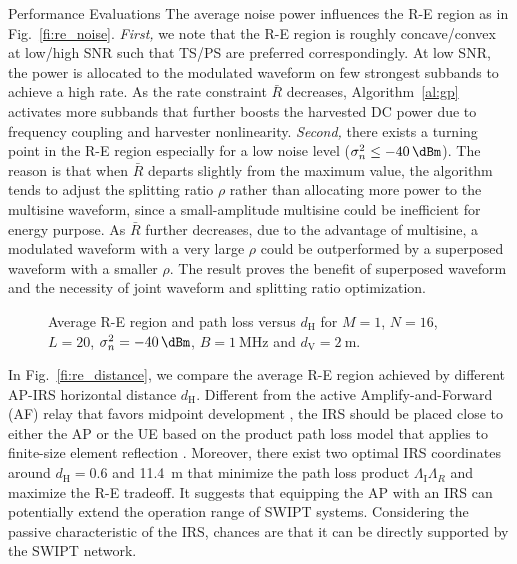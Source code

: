 \documentclass[journal]{IEEEtran}
\begin{document}
\begin{section}{Performance Evaluations}
		The average noise power influences the R-E region as in Fig.~\ref{fi:re_noise}. \emph{First,} we note that the R-E region is roughly concave/convex at low/high SNR such that TS/PS are preferred correspondingly. At low SNR, the power is allocated to the modulated waveform on few strongest subbands to achieve a high rate. As the rate constraint $\bar{R}$ decreases, Algorithm~\ref{al:gp} activates more subbands that further boosts the harvested DC power due to frequency coupling and harvester nonlinearity. \emph{Second,} there exists a turning point in the R-E region especially for a low noise level ($\sigma_n^2 \le \SI{-40}{\dBm}$). The reason is that when $\bar{R}$ departs slightly from the maximum value, the algorithm tends to adjust the splitting ratio $\rho$ rather than allocating more power to the multisine waveform, since a small-amplitude multisine could be inefficient for energy purpose. As $\bar{R}$ further decreases, due to the advantage of multisine, a modulated waveform with a very large $\rho$ could be outperformed by a superposed waveform with a smaller $\rho$. The result proves the benefit of superposed waveform and the necessity of joint waveform and splitting ratio optimization.

		\begin{figure}[!t]
			\centering
			\caption{Average R-E region and path loss versus $d_{\mathrm{H}}$ for $M=1$, $N=16$, $L=20$, $\sigma_n^2=\SI{-40}{\dBm}$, $B=\SI{1}{\MHz}$ and $d_{\mathrm{V}}=\SI{2}{\meter}$.}
		\end{figure}

		In Fig.~\ref{fi:re_distance}, we compare the average R-E region achieved by different AP-IRS horizontal distance $d_{\mathrm{H}}$. Different from the active Amplify-and-Forward (AF) relay that favors midpoint development \cite{Li2017}, the IRS should be placed close to either the AP or the UE based on the product path loss model that applies to finite-size element reflection \cite{Ozdogan2020}. Moreover, there exist two optimal IRS coordinates around $d_{\mathrm{H}}=0.6$ and \SI{11.4}{\meter} that minimize the path loss product $\Lambda_{\mathrm{I}}\Lambda_R$ and maximize the R-E tradeoff. It suggests that equipping the AP with an IRS can potentially extend the operation range of SWIPT systems. Considering the passive characteristic of the IRS, chances are that it can be directly supported by the SWIPT network.


\end{section}
\end{document}
